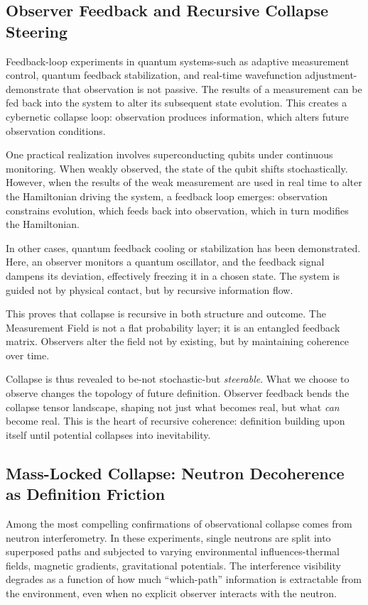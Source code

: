 \subsection{Observer Feedback and Recursive Collapse Steering}

Feedback-loop experiments in quantum systems-such as adaptive measurement control, quantum feedback stabilization, and real-time wavefunction adjustment-demonstrate that observation is not passive. The results of a measurement can be fed back into the system to alter its subsequent state evolution. This creates a cybernetic collapse loop: observation produces information, which alters future observation conditions.

One practical realization involves superconducting qubits under continuous monitoring. When weakly observed, the state of the qubit shifts stochastically. However, when the results of the weak measurement are used in real time to alter the Hamiltonian driving the system, a feedback loop emerges: observation constrains evolution, which feeds back into observation, which in turn modifies the Hamiltonian. 

In other cases, quantum feedback cooling or stabilization has been demonstrated. Here, an observer monitors a quantum oscillator, and the feedback signal dampens its deviation, effectively freezing it in a chosen state. The system is guided not by physical contact, but by recursive information flow.

This proves that collapse is recursive in both structure and outcome. The Measurement Field is not a flat probability layer; it is an entangled feedback matrix. Observers alter the field not by existing, but by maintaining coherence over time.

Collapse is thus revealed to be-not stochastic-but \textit{steerable}. What we choose to observe changes the topology of future definition. Observer feedback bends the collapse tensor landscape, shaping not just what becomes real, but what \textit{can} become real. This is the heart of recursive coherence: definition building upon itself until potential collapses into inevitability.

\subsection{Mass-Locked Collapse: Neutron Decoherence as Definition Friction}

Among the most compelling confirmations of observational collapse comes from neutron interferometry. In these experiments, single neutrons are split into superposed paths and subjected to varying environmental influences-thermal fields, magnetic gradients, gravitational potentials. The interference visibility degrades as a function of how much “which-path” information is extractable from the environment, even when no explicit observer interacts with the neutron.

